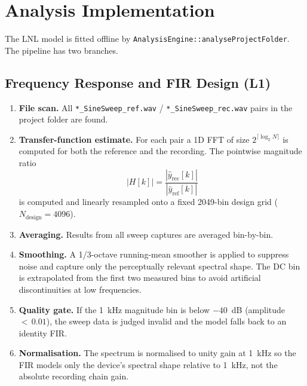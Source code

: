 \documentclass[11pt, letterpaper]{article}
\begin{document}
\section{Analysis Implementation}

The LNL model is fitted offline by
\texttt{AnalysisEngine::analyseProjectFolder}.  The pipeline has two
branches.

\subsection{Frequency Response and FIR Design (L1)}

\begin{enumerate}
  \item \textbf{File scan.}  All \texttt{*\_SineSweep\_ref.wav} /
        \texttt{*\_SineSweep\_rec.wav} pairs in the project folder are
        found.

  \item \textbf{Transfer-function estimate.}  For each pair a 1D FFT
        of size \(2^{\lceil\log_2 N\rceil}\) is computed for both the
        reference and the recording.  The pointwise magnitude ratio
        \[
          |H[k]| = \frac{|\hat{y}_{\text{rec}}[k]|}{|\hat{y}_{\text{ref}}[k]|}
        \]
        is computed and linearly resampled onto a fixed 2049-bin design
        grid (\(N_{\text{design}} = 4096\)).

  \item \textbf{Averaging.}  Results from all sweep captures are
        averaged bin-by-bin.

  \item \textbf{Smoothing.}  A 1/3-octave running-mean smoother is
        applied to suppress noise and capture only the perceptually
        relevant spectral shape.  The DC bin is extrapolated from the
        first two measured bins to avoid artificial discontinuities at
        low frequencies.

  \item \textbf{Quality gate.}  If the 1~kHz magnitude bin is below
        \(-40\)~dB (amplitude~\(<\,0.01\)), the sweep data is judged
        invalid and the model falls back to an identity FIR.

  \item \textbf{Normalisation.}  The spectrum is normalised to unity
        gain at 1~kHz so the FIR models only the device's spectral
        shape relative to 1~kHz, not the absolute recording chain gain.


\end{enumerate}
\end{document}
